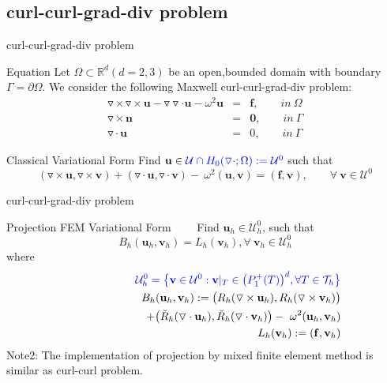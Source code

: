 \documentclass[13pt]{beamer}
\begin{document}
\subsection{curl-curl-grad-div problem}
\begin{frame}[t]{curl-curl-grad-div problem}
  \begin{block}{Equation}
   Let $\Omega\subset\mathbb{R}^d (d=2,3)$ be an open,bounded domain with boundary $\Gamma=\partial\Omega.$
We consider the following Maxwell curl-curl-grad-div problem:
  \begin{eqnarray}
     \triangledown\times\triangledown\times \textbf{u} - \triangledown\triangledown\cdot\mathbf{u} - \omega^2\mathbf{u} & = & \mathbf{f}, \qquad  in\ \Omega \\
     \triangledown\times\mathbf{n} & = & \mathbf{0}, \qquad in\ \Gamma\\
     \triangledown\cdot\mathbf{u}  & = & 0, \qquad in \ \Gamma
  \end{eqnarray}
  \end{block}
  \begin{block}{Classical Variational Form}
    Find $\mathbf{u}\in{\color{blue}\mathcal{U}\cap H_0(\triangledown\cdot;\Omega):= \mathcal{U}^{0}}$ such that
    \[(\triangledown\times\mathbf{u},\triangledown\times\mathbf{v}) + (\triangledown\cdot\mathbf{u},\triangledown\cdot\mathbf{v}) - \
    \omega^2(\mathbf{u},\mathbf{v}) = (\mathbf{f},\mathbf{v}), \qquad \forall\ \mathbf{v}\in\mathcal{U}^{0}\]
  \end{block}
\end{frame}

\begin{frame}[t]{curl-curl-grad-div problem}
   \begin{block}{Projection FEM Variational Form}
     $\qquad$Find $\mathbf{u}_h\in\mathcal{U}^{0}_{h}$, such that {\color{red}\[B_h(\mathbf{u}_h,\mathbf{v}_h) = L_h(\mathbf{v}_h), \forall\ \mathbf{v}_h\in\mathcal{U}^{0}_{h}\] }
     where
     \begin{eqnarray}
         \nonumber
         &&{\color{blue}\mathcal{U}_h^0 = \big\{\mathbf{v}\in \mathcal{U}^0: \mathbf{v}|_T\in\big(P_{1}^{+}(T)\big)^d, \forall T\in \mathcal{T}_h\big\}} \\ \nonumber
         &&B_h(\mathbf{u}_h,\mathbf{v}_h) := \big(R_h(\triangledown\times\mathbf{u}_h),R_h(\triangledown\times\mathbf{v}_h)\big) \\ \nonumber
         &&\qquad\qquad\qquad + \big(\breve{R}_h(\triangledown\cdot\mathbf{u}_h),\breve{R}_h(\triangledown\cdot\mathbf{v}_h)\big) - \
         \omega^2(\mathbf{u}_h,\mathbf{v}_h)  \\ \nonumber
         &&L_h(\mathbf{v}_h) := (\mathbf{f},\mathbf{v}_h)
     \end{eqnarray}
     Note2: The implementation of projection by mixed finite element method is similar as curl-curl problem. 
   \end{block}
\end{frame}
\end{document}
